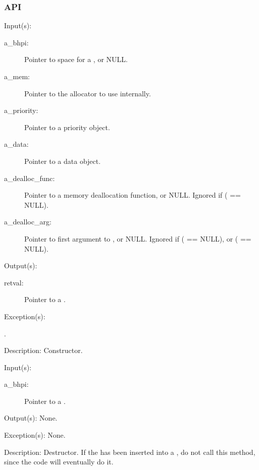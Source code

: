 \subsubsection{API}
\begin{capi}
\label{bhpi_new}
	\begin{capilist}
	\item[Input(s): ]
		\begin{description}\item[]
		\item[a\_bhpi: ]
			Pointer to space for a , or NULL.
		\item[a\_mem: ]
			Pointer to the allocator to use internally.
		\item[a\_priority: ]
			Pointer to a priority object.
		\item[a\_data: ]
			Pointer to a data object.
		\item[a\_dealloc\_func: ]
			Pointer to a memory deallocation function, or NULL.
			Ignored if ( == NULL).
		\item[a\_dealloc\_arg: ]
			Pointer to first argument to , or
			NULL.  Ignored if ( == NULL), or
			( == NULL).
		\end{description}
	\item[Output(s): ]
		\begin{description}\item[]
		\item[retval: ]
			Pointer to a .
		\end{description}
	\item[Exception(s): ]
		\begin{description}\item[]
		\item[.]
		\end{description}
	\item[Description: ]
		Constructor.
	\end{capilist}
\label{bhpi_delete}
	\begin{capilist}
	\item[Input(s): ]
		\begin{description}\item[]
		\item[a\_bhpi: ]
			Pointer to a \classname{bhpi}.
		\end{description}
	\item[Output(s): ] None.
	\item[Exception(s): ] None.
	\item[Description: ]
		Destructor.  If the  has been inserted into a
		, do not call this method, since the
		 code will eventually do it.


\end{capilist}
\end{capi}
